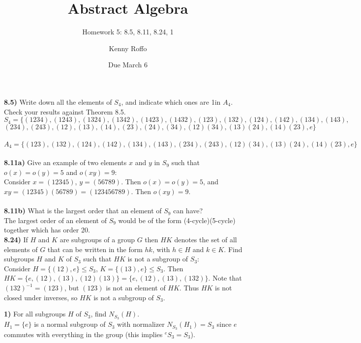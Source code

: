 \documentclass{scrartcl}
\title{Abstract Algebra}
\subtitle{Homework 5: 8.5, 8.11, 8.24, 1}
\author{Kenny Roffo}
\date{Due March 6}
\begin{document}
\maketitle
 
\textbf{8.5)} Write down all the elements of $S_4$, and indicate which ones are 1in $A_4$. Check your results against Theorem 8.5.\\

$S_4=\{(1234),(1243),(1324),(1342),(1423),(1432),(123),(132),(124),(142),(134),(143),$\\

$(234),(243),(12),(13),(14),(23),(24),(34),(12)(34),(13)(24),(14)(23),e\}$\\\\

$A_4=\{(123),(132),(124),(142),(134),(143),(234),(243),(12)(34),(13)(24),(14)(23),e\}$\\\\

\textbf{8.11a)} Give an example of two elements $x$ and $y$ in $S_9$ such that $o(x)=o(y)=5$ and $o(xy)=9$:\\

Consider $x=(12345)$, $y=(56789)$. Then $o(x)=o(y)=5$, and $xy=(12345)(56789)=(123456789)$. Then $o(xy)=9$.\\\\

\textbf{8.11b)} What is the largest order that an element of $S_9$ can have?\\

The largest order of an element of $S_9$ would be of the form (4-cycle)(5-cycle) together which has order 20.\\

\textbf{8.24)} If $H$ and $K$ are subgroups of a group $G$ then $HK$ denotes the set of all elements of $G$ that can be written in the form $hk$, with $h \in H$ and $k \in K$. Find subgroups $H$ and $K$ of $S_3$ such that $HK$ is not a subgroup of $S_3$:\\

Consider $H=\{(12),e\} \le S_3$, $K=\{(13),e\} \le S_3$. Then $HK=\{e,(12),(13),(12)(13)\}=\{e,(12),(13),(132)\}$. Note that $(132)^{-1}=(123)$, but $(123)$ is not an element of $HK$. Thus $HK$ is not closed under inverses, so $HK$ is not a subgroup of $S_3$.\pagebreak

\textbf{1)} For all subgroups $H$ of $S_3$, find $N_{S_3}(H)$.\\

$H_1=\{e\}$ is a normal subgroup of $S_3$ with normalizer $N_{S_3}(H_1)=S_3$ since $e$ commutes with everything in the group (this implies $^eS_3=S_3$).\\
\end{document}
